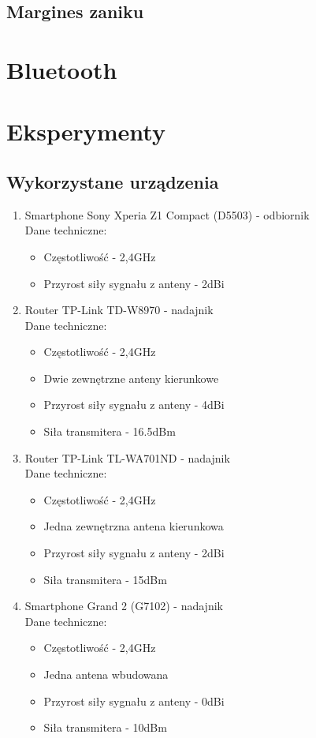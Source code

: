 \documentclass{article}
\begin{document}
		\subsection{Margines zaniku}
	\section{Bluetooth}
	\section{Eksperymenty}
		\subsection{Wykorzystane urządzenia}
			\begin{enumerate}
				\item Smartphone Sony Xperia Z1 Compact (D5503) - odbiornik\\				
					Dane techniczne:
					\begin{itemize}
						\item Częstotliwość - 2,4GHz
						\item Przyrost siły sygnału z anteny - 2dBi
					\end{itemize}
				\item Router TP-Link TD-W8970 - nadajnik\\
				Dane techniczne:
				\begin{itemize}
					\item Częstotliwość - 2,4GHz
					\item Dwie zewnętrzne anteny kierunkowe
					\item Przyrost siły sygnału z anteny - 4dBi
					\item Siła transmitera - 16.5dBm					
				\end{itemize}
				\item Router TP-Link TL-WA701ND - nadajnik\\
				Dane techniczne:
				\begin{itemize}
					\item Częstotliwość - 2,4GHz
					\item Jedna zewnętrzna antena kierunkowa
					\item Przyrost siły sygnału z anteny - 2dBi
					\item Siła transmitera - 15dBm					
				\end{itemize}
				\item Smartphone Grand 2 (G7102) - nadajnik\\
				Dane techniczne:
				\begin{itemize}
					\item Częstotliwość - 2,4GHz
					\item Jedna antena wbudowana
					\item Przyrost siły sygnału z anteny - 0dBi
					\item Siła transmitera - 10dBm					
				\end{itemize}
			\end{enumerate}
\end{document}
